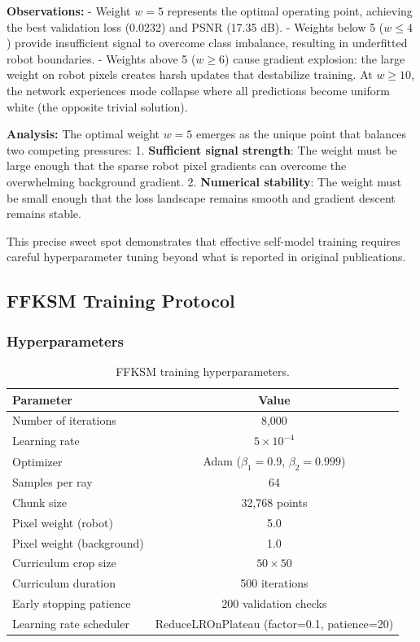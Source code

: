 \documentclass[12pt,a4paper,oneside]{report}
\begin{document}
\textbf{Observations:}
- Weight $w = 5$ represents the optimal operating point, achieving the best validation loss (0.0232) and PSNR (17.35 dB).
- Weights below 5 ($w \leq 4$) provide insufficient signal to overcome class imbalance, resulting in underfitted robot boundaries.
- Weights above 5 ($w \geq 6$) cause gradient explosion: the large weight on robot pixels creates harsh updates that destabilize training. At $w \geq 10$, the network experiences mode collapse where all predictions become uniform white (the opposite trivial solution).

\textbf{Analysis:} The optimal weight $w = 5$ emerges as the unique point that balances two competing pressures:
1. \textbf{Sufficient signal strength}: The weight must be large enough that the sparse robot pixel gradients can overcome the overwhelming background gradient.
2. \textbf{Numerical stability}: The weight must be small enough that the loss landscape remains smooth and gradient descent remains stable.

This precise sweet spot demonstrates that effective self-model training requires careful hyperparameter tuning beyond what is reported in original publications.

\subsection{FFKSM Training Protocol}
\label{subsec:ffksm_training_protocol}

\subsubsection{Hyperparameters}

\begin{table}[H]
\centering
\caption{FFKSM training hyperparameters.}
\label{tab:ffksm_hyperparams}
\begin{tabular}{lc}
\toprule
Parameter & Value \\
\midrule
Number of iterations & 8,000 \\
Learning rate & $5 \times 10^{-4}$ \\
Optimizer & Adam ($\beta_1=0.9$, $\beta_2=0.999$) \\
Samples per ray & 64 \\
Chunk size & 32,768 points \\
Pixel weight (robot) & 5.0 \\
Pixel weight (background) & 1.0 \\
Curriculum crop size & $50 \times 50$ \\
Curriculum duration & 500 iterations \\
Early stopping patience & 200 validation checks \\
Learning rate scheduler & ReduceLROnPlateau (factor=0.1, patience=20) \\
\bottomrule
\end{tabular}
\end{table}
\end{document}
